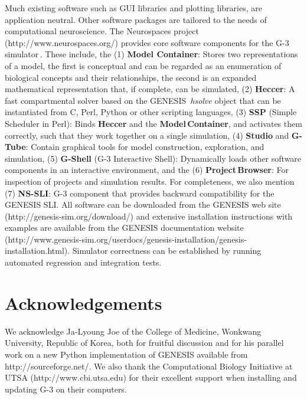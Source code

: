\documentclass[10pt]{article}
\begin{document}
Much existing software such as GUI libraries and plotting libraries,
are application neutral.  Other software packages are tailored to the
needs of computational neuroscience.  The Neurospaces project
(http://www.neurospaces.org/) provides core software components for the
G-3 simulator\,\cite{cornelis03:_neuros}. These include, the (1) {\bf
  Model Container}: Stores two representations of a model, the first
is conceptual and can be regarded as an enumeration of biological
concepts and their relationships, the second is an expanded
mathematical representation that, if complete, can be simulated, (2)
{\bf Heccer}: A fast compartmental solver based on the GENESIS\,{\it
  hsolve} object that can be instantiated from C, Perl, Python or
other scripting languages, (3) {\bf SSP} (Simple Scheduler in Perl):
Binds {\bf Heccer} and the {\bf Model\,Container}, and activates them
correctly, such that they work together on a single simulation, (4)
{\bf Studio} and {\bf G-Tube}: Contain graphical tools for model
construction, exploration, and simulation, (5) {\bf G-Shell} (G-3
Interactive Shell): Dynamically loads other software components in an
interactive environment, and the (6) {\bf Project\,Browser}: For
inspection of projects and simulation results. For completeness, we
also mention (7) {\bf NS-SLI}: G-3 component that provides
backward compatibility for the GENESIS SLI. All software can be
downloaded from the GENESIS web site
(http://genesis-sim.org/download/) and extensive installation
instructions with examples are available from the GENESIS
documentation website
(http://www.genesis-sim.org/userdocs/genesis-installation/genesis-installation.html).
Simulator correctness can be established by running automated
regression and integration tests.



\section*{Acknowledgements}

We acknowledge Ja-Lyoung Joe of the College of Medicine, Wonkwang University, Republic of Korea, both for fruitful discussion and for his parallel work on a new Python implementation of GENESIS available from
http://sourceforge.net/. We also thank the Computational Biology Initiative at UTSA (http://www.cbi.utsa.edu) for their excellent support when installing and updating G-3 on their computers.
\end{document}
